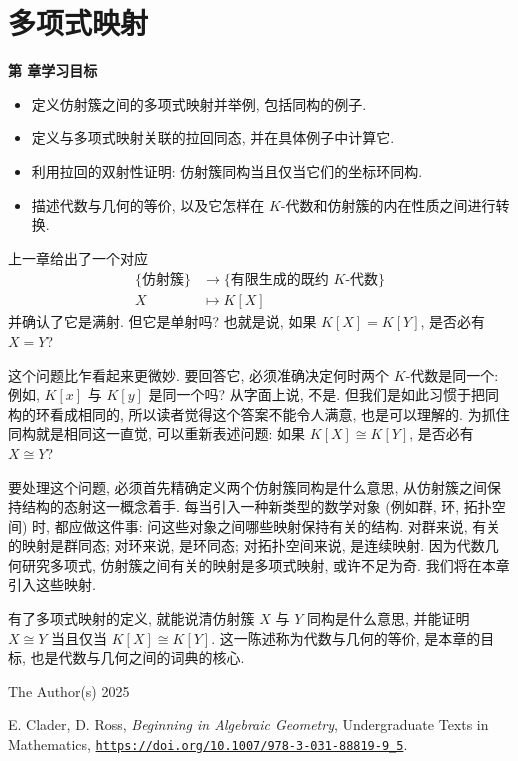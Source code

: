 \chapter{多项式映射}\label{chap:polynomial-maps}

\noindent\textbf{第 \thechapter{} 章学习目标}
\begin{itemize}
  \item 定义仿射簇之间的多项式映射并举例, 包括同构的例子.
  \item 定义与多项式映射关联的拉回同态, 并在具体例子中计算它.
  \item 利用拉回的双射性证明: 仿射簇同构当且仅当它们的坐标环同构.
  \item 描述代数与几何的等价, 以及它怎样在 $K$-代数和仿射簇的内在性质之间进行转换.
\end{itemize}

上一章给出了一个对应
\[
  \begin{aligned}
    \{\text{仿射簇}\}&\to\{\text{有限生成的既约 }K\text{-代数}\}\\
    X&\mapsto K[X]
  \end{aligned}
\]
并确认了它是满射. 但它是单射吗? 也就是说, 如果 $K[X]=K[Y]$, 是否必有 $X=Y$?

这个问题比乍看起来更微妙. 要回答它, 必须准确决定何时两个 $K$-代数是\textquotedbl{}同一个\textquotedbl{}: 例如, $K[x]$ 与 $K[y]$ 是同一个吗? 从字面上说, 不是. 但我们是如此习惯于把同构的环看成相同的, 所以读者觉得这个答案不能令人满意, 也是可以理解的. 为抓住同构就是\textquotedbl{}相同\textquotedbl{}这一直觉, 可以重新表述问题: 如果 $K[X]\cong K[Y]$, 是否必有 $X\cong Y$?

要处理这个问题, 必须首先精确定义两个仿射簇\textquotedbl{}同构\textquotedbl{}是什么意思, 从仿射簇之间保持结构的\textquotedbl{}态射\textquotedbl{}这一概念着手. 每当引入一种新类型的数学对象 (例如群, 环, 拓扑空间) 时, 都应做这件事: 问这些对象之间哪些映射保持有关的结构. 对群来说, 有关的映射是群同态; 对环来说, 是环同态; 对拓扑空间来说, 是连续映射. 因为代数几何研究多项式, 仿射簇之间有关的映射是多项式映射, 或许不足为奇. 我们将在本章引入这些映射.

有了多项式映射的定义, 就能说清仿射簇 $X$ 与 $Y$ 同构是什么意思, 并能证明 $X\cong Y$ 当且仅当 $K[X]\cong K[Y]$. 这一陈述称为\textquotedbl{}代数与几何的等价\textquotedbl{}, 是本章的目标, 也是代数与几何之间的词典的核心.

\par\smallskip
{\footnotesize
\noindent\textcopyright{} The Author(s) 2025\par
\noindent E. Clader, D. Ross, \emph{Beginning in Algebraic Geometry}, Undergraduate Texts in Mathematics,
\href{https://doi.org/10.1007/978-3-031-88819-9_5}{\nolinkurl{https://doi.org/10.1007/978-3-031-88819-9_5}}.\par}
